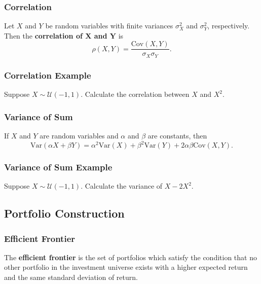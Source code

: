 \documentclass{beamer}
\begin{document}
\begin{frame}
\frametitle{Correlation}
\begin{Definition} 
Let $X$ and $Y$ be random variables with finite variances $\sigma_X^2$ and $\sigma_Y^2$, respectively. Then the {\bf correlation of $\boldsymbol X$ and $\boldsymbol Y$} is
$$
\rho(X, Y) = \frac{\text{Cov}(X, Y)}{\sigma_X\sigma_Y}.
$$
\end{Definition}

\end{frame}

\begin{frame}[t]
\frametitle{Correlation Example}
\begin{Example}
Suppose $X\sim{\mathcal{U}(-1, 1)}$. Calculate the correlation between $X$ and $X^2$.
\end{Example}

\end{frame}

\begin{frame}
\frametitle{Variance of Sum}

\begin{Theorem}
If $X$ and $Y$ are random variables and $\alpha$ and $\beta$ are constants, then
$$
\text{Var}(\alpha X + \beta Y) = \alpha^2 \text{Var}(X) + \beta^2\text{Var}(Y) + 2\alpha\beta \text{Cov}(X, Y).
$$
\end{Theorem}
\end{frame}

\begin{frame}[t]
\frametitle{Variance of Sum Example}
\begin{Example}
Suppose $X\sim{\mathcal{U}(-1, 1)}$. Calculate the variance of $X - 2 X^2$.
\end{Example}

\end{frame}

\subsection{Portfolio Construction}

\begin{frame}
\frametitle{Efficient Frontier}

\begin{Definition}
The {\bf efficient frontier} is the set of portfolios which satisfy the condition that no other portfolio in the investment universe exists with a higher expected return and the same standard deviation of return.
\end{Definition}
\begin{figure}
\centering
{}
\end{figure}
\end{frame}
\end{document}
